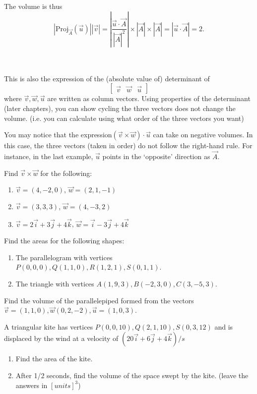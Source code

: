 The volume is thus \[
	|\textrm{Proj}_{\vec{A}}(\vec{u})||\vec{v}|=\left|\frac{\vec{u}\cdot\vec{A}}{|\vec{A}|^2}\right|\times |\vec{A}| \times|\vec{A}| = |\vec{u}\cdot\vec{A}| = 2.
\]\ \\

\ \\

\begin{remark}
	This is also the expression of the (absolute value of) determinant of \[
	\begin{bmatrix}
		\vec{v}&\vec{w}&\vec{u}
	\end{bmatrix}
	\]
	where $\vec{v},\vec{w},\vec{u}$ are written as column vectors.
	Using properties of the determinant (later chapters), you can show cycling the three vectors does not change the volume. (i.e. you can calculate using what order of the three vectors you want)
\end{remark}
	
\begin{remark}
	You may notice that the expression$(\vec{v}\times\vec{w})\cdot{\vec{u}}$ can take on negative volumes. In this case, the three vectors (taken in order) do not follow the right-hand rule. For instance, in the last example, $\vec{u}$ points in the `opposite' direction as $\vec{A}$.
\end{remark}
\exercises
\begin{exerciselist}
	\item Find $\vec{v}\times\vec{w}$ for the following: \begin{enumerate}[label=(\alph*)]
		\item $\vec{v}=(4,-2,0)$, $\vec{w}=(2,1,-1)$
		\item $\vec{v}=(3,3,3)$, $\vec{w}=(4,-3,2)$
		\item $\vec{v}=2\vec{i}+3\vec{j}+4\vec{k}$, $\vec{w}=\vec{i}-3\vec{j}+4\vec{k}$
	\end{enumerate}
	\item Find the areas for the following shapes:\begin{enumerate}[label=(\alph*)]
		\item The parallelogram with vertices $P(0,0,0), Q(1,1,0),R(1,2,1),S(0,1,1)$.
		\item The triangle with vertices $A(1,9,3),B(-2,3,0),C(3,-5,3)$.
	\end{enumerate}
	\item Find the volume of the parallelepiped formed from the vectors $\vec{v}=(1,1,0),\vec{w}(0,2,-2),\vec{u}=(1,0,3)$.
	\item A triangular kite has vertices $P(0,0,10),Q(2,1,10),S(0,3,12)$ and is displaced by the wind at a velocity of $(20\vec{i}+6\vec{j}+4\vec{k})/s$\begin{enumerate}[label=(\alph*)]
		\item Find the area of the kite.
		\item After 1/2 seconds, find the volume of the space swept by the kite. (leave the answers in $[units]^3$)
	\end{enumerate}
\end{exerciselist}

